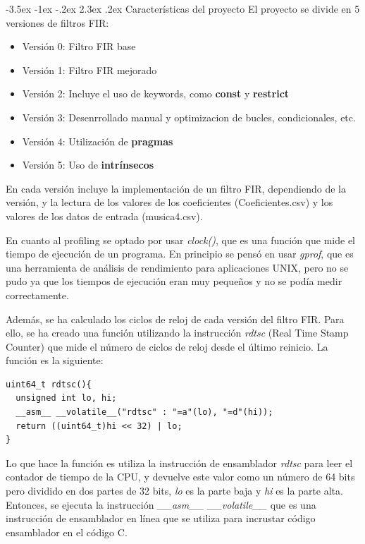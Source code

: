 \documentclass[11pt]{report}
\makeatletter
\renewcommand\chapter{\@startsection{chapter}{0}{\z@}%
    {-3.5ex \@plus -1ex \@minus -.2ex}%
    {2.3ex \@plus.2ex}%
    {\normalfont\Large\bfseries}}
\makeatother
\begin{document}
\chapter{Características del proyecto}
El proyecto se divide en 5 versiones de filtros FIR:
\begin{itemize}
  \item Versión 0: Filtro FIR base
  \item Versión 1: Filtro FIR mejorado
  \item Versión 2: Incluye el uso de keywords, como \textbf{const} y \textbf{restrict}
  \item Versión 3: Desenrrollado manual y optimizacion de bucles, condicionales, etc.
  \item Versión 4: Utilización de \textbf{pragmas}
  \item Versión 5: Uso de \textbf{intrínsecos}
\end{itemize}

En cada versión incluye la implementación de un filtro FIR, dependiendo de la versión, y la lectura de los valores
de los coeficientes (Coeficientes.csv) y los valores de los datos de entrada (musica4.csv).

En cuanto al profiling se optado por usar \emph{clock()}, que es una función que mide el tiempo de ejecución de un programa. En principio
se pensó en usar \emph{gprof}, que es una herramienta de análisis de rendimiento para aplicaciones UNIX, pero no se pudo ya que los tiempos
de ejecución eran muy pequeños y no se podía medir correctamente.

Además, se ha calculado los ciclos de reloj de cada versión del filtro FIR. Para ello, se ha creado una función utilizando la instrucción
\emph{rdtsc} (Real Time Stamp Counter) que mide el número de ciclos de reloj desde el último reinicio. La función es la siguiente:
\begin{lstlisting}
uint64_t rdtsc(){
  unsigned int lo, hi;
  __asm__ __volatile__("rdtsc" : "=a"(lo), "=d"(hi));
  return ((uint64_t)hi << 32) | lo;
}
\end{lstlisting}

Lo que hace la función es utiliza la instrucción de ensamblador \emph{rdtsc} para leer el contador de tiempo de la CPU, y devuelve este 
valor como un número de 64 bits pero dividido en dos partes de 32 bits, \emph{lo} es la parte baja y \emph{hi} es la parte alta. Entonces,
se ejecuta la instrucción \emph{\_\_asm\_\_ \_\_volatile\_\_} que es una instrucción de ensamblador en línea que se utiliza para incrustar código
ensamblador en el código C.
\end{document}
